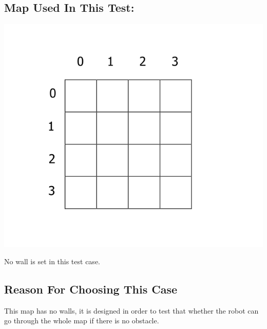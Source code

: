 \documentclass[11pt, a4paper]{report}
\begin{document}
\subsection{Map Used In This Test:}
\begin{center}
\includegraphics[scale=0.4]{./image/Test1.png}
\end{center}

No wall is set in this test case.\\
\subsection{Reason For Choosing This Case}
This map has no walls, it is designed in order to test that whether the robot can go through the whole map if there is no obstacle.
\end{document}
